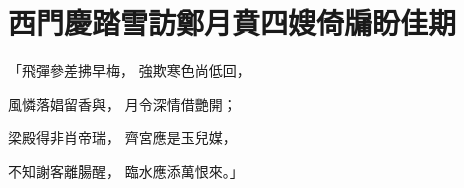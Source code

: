 %

\chapter{西門慶踏雪訪鄭月\KG 賁四嫂倚牖盼佳期}


\begin{showcontents}{}




「飛彈參差拂早梅，  強欺寒色尚低回，

風憐落娼留香與，  月令深情借艷開；

梁殿得非肖帝瑞，  齊宮應是玉兒媒，

不知謝客離腸醒，  臨水應添萬恨來。」


\end{showcontents}
